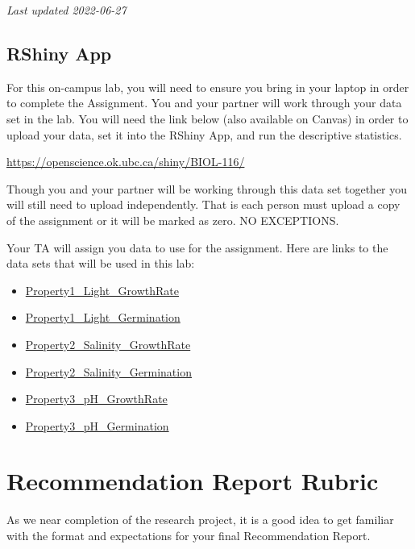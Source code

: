 \documentclass[
]{book}
\providecommand{\tightlist}{%
  \setlength{\itemsep}{0pt}\setlength{\parskip}{0pt}}
\begin{document}
\emph{Last updated 2022-06-27}

\hypertarget{rshiny-app}{%
\subsection*{RShiny App}\label{rshiny-app}}

For this on-campus lab, you will need to ensure you bring in your laptop in order to complete the Assignment. You and your partner will work through your data set in the lab. You will need the link below (also available on Canvas) in order to upload your data, set it into the RShiny App, and run the descriptive statistics.

\url{https://openscience.ok.ubc.ca/shiny/BIOL-116/}

Though you and your partner will be working through this data set together you will still need to upload independently. That is each person must upload a copy of the assignment or it will be marked as zero. NO EXCEPTIONS.

Your TA will assign you data to use for the assignment. Here are links to the data sets that will be used in this lab:

\begin{itemize}
\tightlist
\item
  \href{files/Property1_Light_GrowthRate.csv}{Property1\_Light\_GrowthRate}
\item
  \href{files/Property1_Light_Germination.csv}{Property1\_Light\_Germination}
\item
  \href{files/Property2_Salinity_GrowthRate.csv}{Property2\_Salinity\_GrowthRate}
\item
  \href{files/Property2_Salinity_Germination.csv}{Property2\_Salinity\_Germination}
\item
  \href{files/Property3_pH_GrowthRate.csv}{Property3\_pH\_GrowthRate}
\item
  \href{files/Property3_pH_Germination.csv}{Property3\_pH\_Germination}
\end{itemize}

\hypertarget{recommendation-report-rubric}{%
\section*{Recommendation Report Rubric}\label{recommendation-report-rubric}}

As we near completion of the research project, it is a good idea to get familiar with the format and expectations for your final Recommendation Report.
\end{document}
